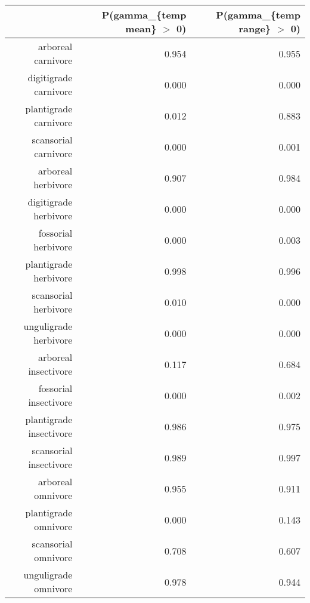 \begin{table}[ht]
\centering
\begin{tabular}{rrr}
  \hline
 & P(gamma\_\{temp mean\} $>$ 0) & P(gamma\_\{temp range\} $>$ 0) \\ 
  \hline
arboreal carnivore & 0.954 & 0.955 \\ 
  digitigrade carnivore & 0.000 & 0.000 \\ 
  plantigrade carnivore & 0.012 & 0.883 \\ 
  scansorial carnivore & 0.000 & 0.001 \\ 
  arboreal herbivore & 0.907 & 0.984 \\ 
  digitigrade herbivore & 0.000 & 0.000 \\ 
  fossorial herbivore & 0.000 & 0.003 \\ 
  plantigrade herbivore & 0.998 & 0.996 \\ 
  scansorial herbivore & 0.010 & 0.000 \\ 
  unguligrade herbivore & 0.000 & 0.000 \\ 
  arboreal insectivore & 0.117 & 0.684 \\ 
  fossorial insectivore & 0.000 & 0.002 \\ 
  plantigrade insectivore & 0.986 & 0.975 \\ 
  scansorial insectivore & 0.989 & 0.997 \\ 
  arboreal omnivore & 0.955 & 0.911 \\ 
  plantigrade omnivore & 0.000 & 0.143 \\ 
  scansorial omnivore & 0.708 & 0.607 \\ 
  unguligrade omnivore & 0.978 & 0.944 \\ 
   \hline
\end{tabular}
\label{tab:occur_temp}
\end{table}
